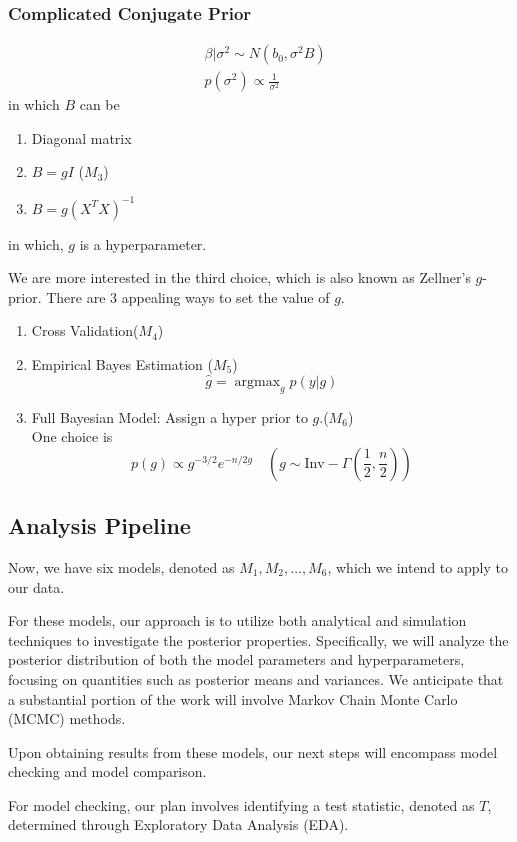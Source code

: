 \documentclass[12pt,a4paper]{article}
\begin{document}
\subsubsection{Complicated Conjugate Prior}
\begin{align*}
&\beta|\sigma^2 \sim N(b_0, \sigma^2 B) \\
&p(\sigma^2) \propto \frac{1}{\sigma^2} 
\end{align*}
in which $B$ can be
\begin{enumerate}
    \item Diagonal matrix 
    \item $B=gI$  \quad\quad($M_3$)
    \item $B=g(X^TX)^{-1}$ 
\end{enumerate} 
in which, $g$ is a hyperparameter. 

We are more interested in the third choice, which is also known as Zellner’s $g$-prior. There are 3 appealing ways to set the value of $g$.
\begin{enumerate}
    \item Cross Validation\quad\quad($M_4$)
    \item Empirical Bayes Estimation \quad\quad($M_5$)
    $$\hat{g} = \operatorname{argmax}_g p(y|g)$$
    \item Full Bayesian Model: Assign a hyper prior to $g$.\quad\quad($M_6$)\\
    One choice is
$$
p(g) \propto g^{-3/2} e^{-n/2g} \quad ( g \sim \text{Inv}-\Gamma(\frac{1}{2}, \frac{n}{2} ) )
$$
\end{enumerate}

\subsection{Analysis Pipeline}
Now, we have six models, denoted as $M_1, M_2, \ldots, M_6$, which we intend to apply to our data.

For these models, our approach is to utilize both analytical and simulation techniques to investigate the posterior properties. Specifically, we will analyze the posterior distribution of both the model parameters and hyperparameters, focusing on quantities such as posterior means and variances. We anticipate that a substantial portion of the work will involve Markov Chain Monte Carlo (MCMC) methods.

Upon obtaining results from these models, our next steps will encompass model checking and model comparison.

For model checking, our plan involves identifying a test statistic, denoted as $T$, determined through Exploratory Data Analysis (EDA).
\end{document}
